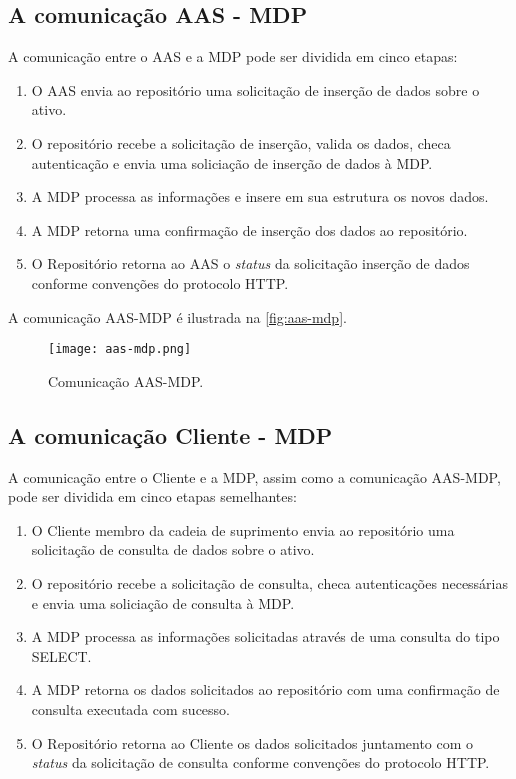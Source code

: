 \subsection{A comunicação AAS - MDP}
	
	A comunicação entre o AAS e a MDP pode ser dividida em cinco etapas:
	
	\begin{enumerate}
		\item O AAS envia ao repositório uma solicitação de inserção de dados sobre o ativo.
		\item O repositório recebe a solicitação de inserção, valida os dados, checa autenticação e envia uma soliciação de inserção de dados à MDP.
		\item A MDP processa as informações e insere em sua estrutura os novos dados.
		\item A MDP retorna uma confirmação de inserção dos dados ao repositório.
		\item O Repositório retorna ao AAS o \textit{status} da solicitação inserção de dados conforme convenções do protocolo HTTP.
	\end{enumerate}
	
	A comunicação AAS-MDP é ilustrada na \autoref{fig:aas-mdp}.
	
	\begin{figure}[htb]
		\centering
		\caption{Comunicação AAS-MDP.}
		\label{fig:aas-mdp}
		\texttt{[image: aas-mdp.png]}
	\end{figure}

\subsection{A comunicação Cliente - MDP}
	
	A comunicação entre o Cliente e a MDP, assim como a comunicação AAS-MDP, pode ser dividida em cinco etapas semelhantes:
	
	\begin{enumerate}
		\item O Cliente membro da cadeia de suprimento envia ao repositório uma solicitação de consulta de dados sobre o ativo.
		\item O repositório recebe a solicitação de consulta, checa autenticações necessárias e envia uma soliciação de consulta à MDP.
		\item A MDP processa as informações solicitadas através de uma consulta do tipo SELECT.
		\item A MDP retorna os dados solicitados ao repositório com uma confirmação de consulta executada com sucesso.
		\item O Repositório retorna ao Cliente os dados solicitados juntamento com o \textit{status} da solicitação de consulta conforme convenções do protocolo HTTP.
	\end{enumerate}
	
